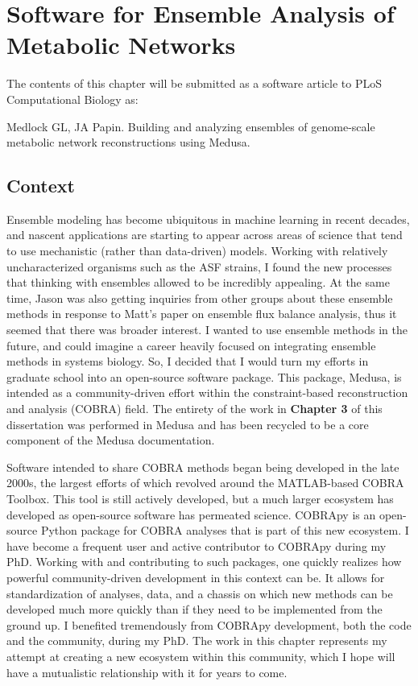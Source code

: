 \documentclass[11pt,twocolumn,notitlepage,openany,twoside]{book}
\begin{document}
\chapter{Software for Ensemble Analysis of Metabolic Networks}
\begin{refsection}

The contents of this chapter will be submitted as a software article to PLoS Computational Biology as:

\medskip\noindent
Medlock GL, JA Papin. Building and analyzing ensembles of genome-scale metabolic network reconstructions using Medusa.

\section{Context}

Ensemble modeling has become ubiquitous in machine learning in recent decades, and nascent applications are starting to appear across areas of science that tend to use mechanistic (rather than data-driven) models. Working with relatively uncharacterized organisms such as the ASF strains, I found the new processes that thinking with ensembles allowed to be incredibly appealing. At the same time, Jason was also getting inquiries from other groups about these ensemble methods in response to Matt's paper on ensemble flux balance analysis, thus it seemed that there was broader interest. I wanted to use ensemble methods in the future, and could imagine a career heavily focused on integrating ensemble methods in systems biology. So, I decided that I would turn my efforts in graduate school into an open-source software package. This package, Medusa, is intended as a community-driven effort within the constraint-based reconstruction and analysis (COBRA) field. The entirety of the work in \textbf{Chapter 3} of this dissertation was performed in Medusa and has been recycled to be a core component of the Medusa documentation.

Software intended to share COBRA methods began being developed in the late 2000s, the largest efforts of which revolved around the MATLAB-based COBRA Toolbox. This tool is still actively developed, but a much larger ecosystem has developed as open-source software has permeated science. COBRApy is an open-source Python package for COBRA analyses that is part of this new ecosystem. I have become a frequent user and active contributor to COBRApy during my PhD. Working with and contributing to such packages, one quickly realizes how powerful community-driven development in this context can be. It allows for standardization of analyses, data, and a chassis on which new methods can be developed much more quickly than if they need to be implemented from the ground up. I benefited tremendously from COBRApy development, both the code and the community, during my PhD. The work in this chapter represents my attempt at creating a new ecosystem within this community, which I hope will have a mutualistic relationship with it for years to come.


\end{refsection}
\end{document}
